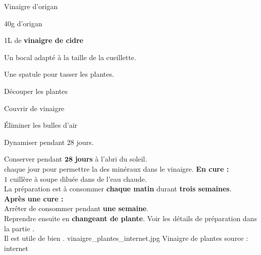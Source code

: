 \ficherecette
{%
    Vinaigre d'origan
}
{%
    \item 40g d'origan
    \item 1L de \textbf{vinaigre de cidre}
}
{%
    \item Un bocal adapté à la taille de la cueillette.
    \item Une spatule pour tasser les plantes.

}
{%
    \item Découper les plantes
    \item Couvrir de vinaigre
    \item \'Eliminer les bulles d'air
    \item Dynamiser pendant $28$ jours.
}
{%
    Conserver pendant $\mathbf{28}$ \textbf{jours} à l'abri du soleil. \\
     chaque jour pour permettre la  des minéraux dans le vinaigre.
    \textbf{En cure :}\\
    $1$ cuillère à soupe diluée dans de l'eau chaude.\\
    La préparation est à consommer \textbf{chaque matin} durant \textbf{trois semaines}.\\

    \textbf{Après une cure :}\\
    Arrêter de consommer pendant \textbf{une semaine}. \\
    Reprendre ensuite en \textbf{changeant de plante}.
}
{%
    Voir les détails de préparation dans la partie .\\

    Il est utile de bien .
}
{%
    vinaigre_plantes_internet.jpg
}
{%
    Vinaigre de plantes
}
{%
    source : internet
}